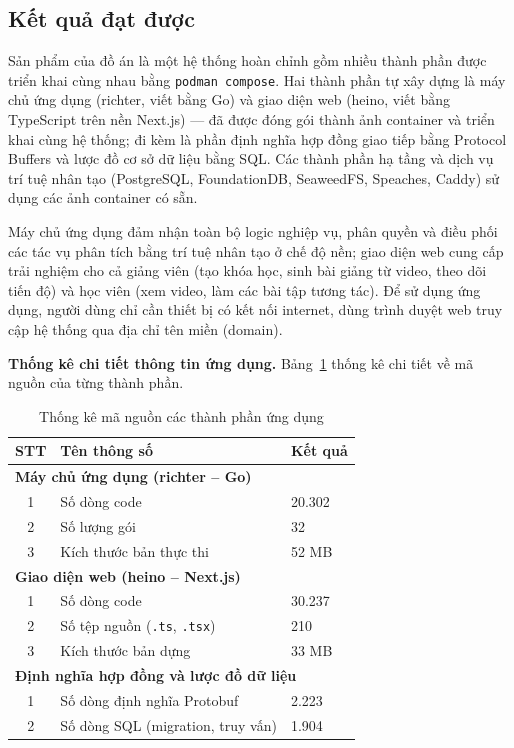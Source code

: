 \documentclass[../DoAn.tex]{subfiles}
\begin{document}
\subsection{Kết quả đạt được}
Sản phẩm của đồ án là một hệ thống hoàn chỉnh gồm nhiều thành phần được triển khai cùng nhau bằng \texttt{podman compose}. Hai thành phần tự xây dựng là máy chủ ứng dụng (richter, viết bằng Go) và giao diện web (heino, viết bằng TypeScript trên nền Next.js) --- đã được đóng gói thành ảnh container và triển khai cùng hệ thống; đi kèm là phần định nghĩa hợp đồng giao tiếp bằng Protocol Buffers và lược đồ cơ sở dữ liệu bằng SQL. Các thành phần hạ tầng và dịch vụ trí tuệ nhân tạo (PostgreSQL, FoundationDB, SeaweedFS, Speaches, Caddy) sử dụng các ảnh container có sẵn.

Máy chủ ứng dụng đảm nhận toàn bộ logic nghiệp vụ, phân quyền và điều phối các tác vụ phân tích bằng trí tuệ nhân tạo ở chế độ nền; giao diện web cung cấp trải nghiệm cho cả giảng viên (tạo khóa học, sinh bài giảng từ video, theo dõi tiến độ) và học viên (xem video, làm các bài tập tương tác). Để sử dụng ứng dụng, người dùng chỉ cần thiết bị có kết nối internet, dùng trình duyệt web truy cập hệ thống qua địa chỉ tên miền (domain).

\textbf{Thống kê chi tiết thông tin ứng dụng.} Bảng~\ref{tbl:stats} thống kê chi tiết về mã nguồn của từng thành phần.

\begin{table}[H]
\centering
\begin{tabular}{|c|l|l|}
\hline
\textbf{STT} & \textbf{Tên thông số} & \textbf{Kết quả} \\ \hline
\multicolumn{3}{|l|}{\textbf{Máy chủ ứng dụng (richter -- Go)}} \\ \hline
1 & Số dòng code & 20.302 \\ \hline
2 & Số lượng gói & 32 \\ \hline
3 & Kích thước bản thực thi & 52 MB \\ \hline
\multicolumn{3}{|l|}{\textbf{Giao diện web (heino -- Next.js)}} \\ \hline
1 & Số dòng code & 30.237 \\ \hline
2 & Số tệp nguồn (\texttt{.ts}, \texttt{.tsx}) & 210 \\ \hline
3 & Kích thước bản dựng & 33 MB \\ \hline
\multicolumn{3}{|l|}{\textbf{Định nghĩa hợp đồng và lược đồ dữ liệu}} \\ \hline
1 & Số dòng định nghĩa Protobuf & 2.223 \\ \hline
2 & Số dòng SQL (migration, truy vấn) & 1.904 \\ \hline
\end{tabular}
\caption{Thống kê mã nguồn các thành phần ứng dụng}
\label{tbl:stats}
\end{table}
\end{document}
